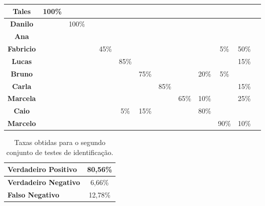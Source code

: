 \begin{table}[htb]
\begin{center}
\begin{tabular}{|c|c|c|c|c|c|c|c|c|c|c|c|c|}
				\hline \bf Tales 			&100\% & 			& 		 & 			&   	 & 			& 		& 		&	 		& 		& 		\\
				\hline \bf Danilo 		& 		 &100\%	& 		 & 			&   	 & 			& 		& 		& 		& 		& 		 		\\
				\hline \bf Ana 				& 		 & 			& 		 & 			&   	 & 			& 		& 		& 		& 		& 		    \\
				\hline \bf Fabricio 	& 		 & 			& 		 &45\%	&      & 			& 		& 		& 		& 5\%	& 50\%    		\\
				\hline \bf Lucas 			& 		 & 			& 		 & 			& 85\% & 			& 		& 		& 		& 		& 15\%		\\
				\hline \bf Bruno 			& 		 & 			& 		 & 			& 		 & 75\% & 	  & 		&20\% & 5\%	& 		  	\\
				\hline \bf Carla 			& 		 & 			& 		 & 			& 		 & 			&85\% &		  & 	  & 		& 15\%		  	\\
				\hline \bf Marcela 		& 		 & 			& 		 & 			& 		 &      & 		&65\% &10\% & 		& 25\%		  	\\
				\hline \bf Caio 		  & 		 & 			& 		 & 			& 	5\%& 	15\%& 		& 		&80\%	&	 		& 		  	\\
				\hline \bf Marcelo 		& 		 & 			& 		 & 			& 		 & 			& 		& 		& 		& 90\%& 10\%		  	\\
				\hline
			\end{tabular}
		\end{center}
	\end{table}

	\begin{table}[htb]
		\begin{center}
			\caption{Taxas obtidas para o segundo conjunto de testes de identificação.}
			\label{tab:taxas2}
			\begin{tabular}{|l|c|}
				\hline \bf Verdadeiro Positivo & 80,56\% \\
				\hline \bf Verdadeiro Negativo & 6,66\% \\
				\hline \bf Falso Negativo & 12,78\% \\
				\hline
			\end{tabular}
		\end{center}
	\end{table}


